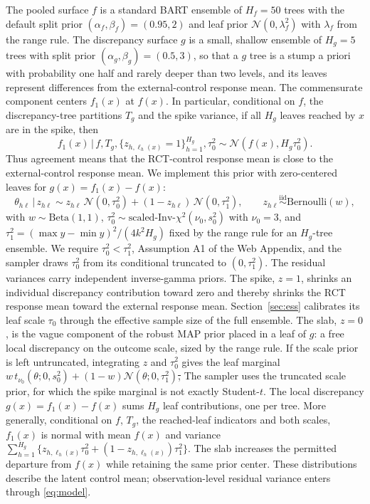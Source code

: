 \documentclass[11pt]{article}
\newcommand{\Normal}{\mathcal{N}}
\newcommand{\Ber}{\mathrm{Bernoulli}}
\newcommand{\given}{\,\vert\,}
\newcommand{\iid}{\stackrel{\text{iid}}{\sim}}
\theoremstyle{definition}
\theoremstyle{plain}
\providecommand{\DIFaddtex}[1]{{\protect\color{blue}\uwave{#1}}} %
\providecommand{\DIFdeltex}[1]{{\protect\color{red}\sout{#1}}}                      %
\providecommand{\DIFaddbegin}{} %
\providecommand{\DIFaddend}{} %
\providecommand{\DIFdelbegin}{} %
\providecommand{\DIFdelend}{} %
\providecommand{\DIFadd}[1]{\texorpdfstring{\DIFaddtex{#1}}{#1}} %
\providecommand{\DIFdel}[1]{\texorpdfstring{\DIFdeltex{#1}}{}} %
\newcommand{\DIFscaledelfig}{0.5}
\newlength{\DIFdelgraphicswidth} %
\newlength{\DIFdelgraphicsheight} %
\newcommand{\DIFaddincludegraphics}[2][]{{\color{blue}\fbox{\DIFOincludegraphics[#1]{#2}}}} %
\newcommand{\DIFdelincludegraphics}[2][]{%
\sbox{\DIFdelgraphicsbox}{\DIFOincludegraphics[#1]{#2}}%
\settoboxwidth{\DIFdelgraphicswidth}{\DIFdelgraphicsbox} %
\settoboxtotalheight{\DIFdelgraphicsheight}{\DIFdelgraphicsbox} %
\scalebox{\DIFscaledelfig}{%
\parbox[b]{\DIFdelgraphicswidth}{\usebox{\DIFdelgraphicsbox}\\[-\baselineskip] \rule{\DIFdelgraphicswidth}{0em}}\llap{\resizebox{\DIFdelgraphicswidth}{\DIFdelgraphicsheight}{%
\setlength{\unitlength}{\DIFdelgraphicswidth}%
\begin{picture}(1,1)%
\thicklines\linethickness{2pt} %
{\color[rgb]{1,0,0}\put(0,0){\framebox(1,1){}}}%
{\color[rgb]{1,0,0}\put(0,0){\line( 1,1){1}}}%
{\color[rgb]{1,0,0}\put(0,1){\line(1,-1){1}}}%
\end{picture}%
}\hspace*{3pt}}} %
} %
\DeclareRobustCommand{\DIFaddbegin}{\DIFOaddbegin \let\includegraphics\DIFaddincludegraphics} %
\DeclareRobustCommand{\DIFaddend}{\DIFOaddend \let\includegraphics\DIFOincludegraphics} %
\DeclareRobustCommand{\DIFdelbegin}{\DIFOdelbegin \let\includegraphics\DIFdelincludegraphics} %
\DeclareRobustCommand{\DIFdelend}{\DIFOaddend \let\includegraphics\DIFOincludegraphics} %
\begin{document}
The pooled surface $f$ is a standard BART ensemble of $H_f=50$ trees with the default split prior $(\alpha_f,\beta_f)=(0.95,2)$ and leaf prior $\Normal(0,\lambda_f^2)$ with $\lambda_f$ from the range rule. The discrepancy surface $g$ is a small, shallow ensemble of $H_g=5$ trees with split prior $(\alpha_g,\beta_g)=(0.5,3)$, so that a $g$ tree is a stump a priori with probability one half and rarely deeper than two levels, and its leaves represent differences from the external-control response mean. The commensurate component centers $f_1(x)$ at $f(x)$. In particular, conditional on $f$, the discrepancy-tree partitions $T_g$ and the spike variance, if all $H_g$ leaves reached by $x$ are in the spike, then
\[
f_1(x)\given f,T_g,\{z_{h,\ell_h(x)}=1\}_{h=1}^{H_g},\tau_0^2
\sim\Normal\!\left(f(x),H_g\tau_0^2\right).
\]
Thus agreement means that the RCT-control response mean is close to the external-control response mean. We implement this prior with zero-centered leaves for $g(x)=f_1(x)-f(x)$:
\begin{equation}
\theta_{h\ell}\given z_{h\ell}\sim z_{h\ell}\,\Normal(0,\tau_0^2)+(1-z_{h\ell})\,\Normal(0,\tau_1^2),\qquad z_{h\ell}\iid\Ber(w),
\label{eq:leafprior}
\end{equation}
with $w\sim\mathrm{Beta}(1,1)$, $\tau_0^2\sim\text{scaled-Inv-}\chi^2(\nu_0,s_0^2)$ with $\nu_0=3$, and $\tau_1^2=(\max y-\min y)^2/(4k^2H_g)$ fixed by the range rule for an $H_g$-tree ensemble. We require $\tau_0^2<\tau_1^2$, Assumption A1 of the Web Appendix, and the sampler draws $\tau_0^2$ from its conditional truncated to $(0,\tau_1^2)$. The residual variances carry independent inverse-gamma priors. The spike, $z=1$, shrinks an individual discrepancy contribution toward zero and thereby shrinks the RCT response mean toward the external response mean. Section~\ref{sec:ess} calibrates its leaf scale $\tau_0$ through the effective sample size of the full ensemble. The slab, $z=0$, is the vague component of the robust MAP prior placed in a leaf of $g$: a free local discrepancy on the outcome scale, sized by the range rule. If the scale prior is left untruncated, integrating $z$ and $\tau_0^2$ gives the leaf marginal $w\,t_{\nu_0}(\theta;0,s_0^2)+(1-w)\Normal(\theta;0,\tau_1^2)$\DIFdelbegin \DIFdel{, }\DIFdelend \DIFaddbegin \DIFadd{. }\DIFaddend The sampler uses the truncated scale prior, for which the spike marginal is not exactly Student-$t$. The local discrepancy $g(x)=f_1(x)-f(x)$ sums $H_g$ leaf contributions, one per tree. More generally, conditional on $f$, $T_g$, the reached-leaf indicators and both scales, $f_1(x)$ is normal with mean $f(x)$ and variance $\sum_{h=1}^{H_g}\{z_{h,\ell_h(x)}\tau_0^2+(1-z_{h,\ell_h(x)})\tau_1^2\}$. The slab increases the permitted departure from $f(x)$ while retaining the same prior center. These distributions describe the latent control mean; observation-level residual variance enters through \eqref{eq:model}.
\end{document}
